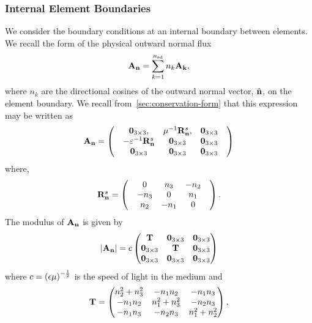 
\subsubsection{Internal Element Boundaries}
We consider the boundary conditions at an internal boundary between elements. We recall the form of the physical outward normal flux
$$\mathbf{A}_\mathbf{n} = \sum_{k=1}^{n_\textrm{sd}} n_{k} \mathbf{A}_\mathbf{k} ,$$
where $n_k$ are the directional cosines of the outward normal vector, $\hat{\mathbf{n}}$, on the element boundary. We recall from~\ref{sec:conservation-form} that this expression may be written as
$$
  \mathbf{A}_\mathbf{n} =
  \begin{pmatrix}
 & \mathbf{0}_{3\times3} , & \mu^{-1} \mathbf{R}^{s}_{\mathbf{n}}, & \mathbf{0}_{3\times3} \\
 & - \varepsilon^{-1} \mathbf{R}^{s}_{\mathbf{n}} & \mathbf{0}_{3\times3} & \mathbf{0}_{3\times3} \\
 & \mathbf{0}_{3\times3} & \mathbf{0}_{3\times3} & \mathbf{0}_{3\times3} 
 & \end{pmatrix}
$$
where,
$$
  \mathbf{R}^{s}_{\mathbf{n}} =
  \begin{pmatrix}
 & 0 & n_3 & -n_2 \\
 & -n_3 & 0 & n_1 \\
& n_2 & -n_1 & 0 
 & \end{pmatrix} .
$$
The modulus of $\mathbf{A}_\mathbf{n}$ is given by
\begin{align*}
\left| \mathbf{A}_\mathbf{n} \right| = c
\begin{pmatrix}
  \mathbf{T} & \mathbf{0}_{3\times3} & \mathbf{0}_{3\times3} \\
  \mathbf{0}_{3\times3}  & \mathbf{T} & \mathbf{0}_{3\times3} \\
   \mathbf{0}_{3\times3} & \mathbf{0}_{3\times3} & \mathbf{0}_{3\times3} 
\end{pmatrix}
\end{align*}
where $c = \left( \epsilon \mu  \right)^{-\frac{1}{2}}$ is the speed of light in the medium and
\begin{align*}
  \mathbf{T} = 
\begin{pmatrix}
n_2^2 + n_3^2 &      -n_1 n_2 &      -n_1 n_3 \\
-n_1 n_2 & n_1^2 + n_3^2 &      -n_2 n_3 \\
-n_1 n_3 &      -n_2 n_3 & n_1^2 + n_2^2 \\
\end{pmatrix} ,
\end{align*}

